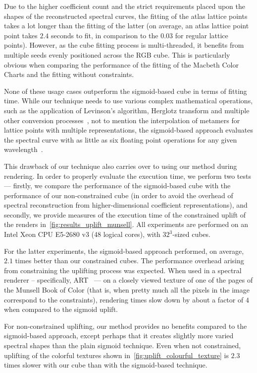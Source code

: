 Due to the higher coefficient count and the strict requirements placed upon the shapes of the reconstructed spectral curves, the fitting of the atlas lattice points takes a lot longer than the fitting of the latter (on average, an atlas lattice point point takes $2.4$ seconds to fit, in comparison to the $0.03$ for regular lattice points). However, as the cube fitting process is multi-threaded, it benefits from multiple seeds evenly positioned across the RGB cube. This is particularly obvious when comparing the performance of the fitting of the Macbeth Color Charts and the fitting without constraints.

None of these usage cases outperform the sigmoid-based cube in terms of fitting time. While our technique needs to use various complex mathematical operations, such as the application of Levinson's algorithm, Herglotz transform and multiple other conversion processes~\cite{trigonometricMomentsPaper}, not to mention the interpolation of metamers for lattice points with multiple representations, the sigmoid-based approach evaluates the spectral curve with as little as six floating point operations for any given wavelength~\cite{upsamplingJakobHanika}.

This drawback of our technique also carries over to using our method during rendering. In order to properly evaluate the execution time, we perform two tests --- firstly, we compare the performance of the sigmoid-based cube with the performance of our non-constrained cube (in order to avoid the overhead of spectral reconstruction from higher-dimensional coefficient representations), and secondly, we provide measures of the execution time of the constrained uplift of the renders in~\cref{fig:results_uplift_munsell}. All experiments are performed on an Intel Xeon CPU E5-2680 v3 (48 logical cores), with $32^3$-sized cubes.

For the latter experiments, the sigmoid-based approach performed, on average, $2.1$ times better than our constrained cubes. The performance overhead arising from constraining the uplifting process was expected. When used in a spectral renderer -- specifically, ART~\cite{ART} --- on a closely viewed texture of one of the pages of the Munsell Book of Color (that is, when pretty much all the pixels in the image correspond to the constraints), rendering times slow down by about a factor of $4$ when compared to the sigmoid uplift.

For non-constrained uplifting, our method provides no benefits compared to the sigmoid-based approach, except perhaps that it creates slightly more varied spectral shapes than the plain sigmoid technique. Even when not constrained, uplifting of the colorful textures shown in~\cref{fig:uplift_colourful_texture} is $2.3$ times slower with our cube than with the sigmoid-based technique.

